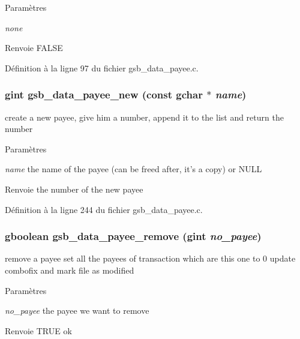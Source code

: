 \begin{DoxyParams}{Paramètres}
\item[{\em none}]\end{DoxyParams}
\begin{DoxyReturn}{Renvoie}
FALSE 
\end{DoxyReturn}


Définition à la ligne 97 du fichier gsb\_\-data\_\-payee.c.

\subsubsection[{gsb\_\-data\_\-payee\_\-new}]{\setlength{\rightskip}{0pt plus 5cm}gint gsb\_\-data\_\-payee\_\-new (const gchar $\ast$ {\em name})}\label{gsb__data__payee_8c_a52d58725c813f6acd19b2e7f4056f162}
create a new payee, give him a number, append it to the list and return the number


\begin{DoxyParams}{Paramètres}
\item[{\em name}]the name of the payee (can be freed after, it's a copy) or NULL\end{DoxyParams}
\begin{DoxyReturn}{Renvoie}
the number of the new payee 
\end{DoxyReturn}


Définition à la ligne 244 du fichier gsb\_\-data\_\-payee.c.

\subsubsection[{gsb\_\-data\_\-payee\_\-remove}]{\setlength{\rightskip}{0pt plus 5cm}gboolean gsb\_\-data\_\-payee\_\-remove (gint {\em no\_\-payee})}\label{gsb__data__payee_8c_a405a586d7f5ca10be88e833b68fa7d57}
remove a payee set all the payees of transaction which are this one to 0 update combofix and mark file as modified


\begin{DoxyParams}{Paramètres}
\item[{\em no\_\-payee}]the payee we want to remove\end{DoxyParams}
\begin{DoxyReturn}{Renvoie}
TRUE ok 
\end{DoxyReturn}


